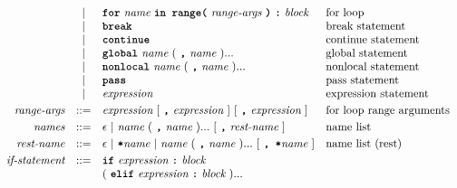 \[\begin{array}{rcll}
                            & |   & \term{for}\ \textit{name}\ \term{in\ range(}
                                    \ \textit{range-args}\ \term{)}\ \term{:}\ \textit{block}                                & \text{for loop}                         \\
                            & |   & \term{break}                                                                             & \text{break statement}                  \\
                            & |   & \term{continue}                                                                          & \text{continue statement}               \\
                            & |   & \term{global}\ \textit{name}\ (\ \term{,}\ \textit{name}\ )...                           & \text{global statement}                   \\
                            & |   & \term{nonlocal}\ \textit{name}\ (\ \term{,}\ \textit{name}\ )...                         & \text{nonlocal statement}               \\
                            & |   & \term{pass}                                                                              & \text{pass statement}               \\
                            & |   & \textit{expression}                                                                      & \text{expression statement}             \\[1mm]
\textit{range-args}         & ::= & \textit{expression}\ [\ \term{,}\ \textit{expression}\ ]
                                    \ [\ \term{,}\ \textit{expression}\ ]                                                    & \text{for loop range arguments}         \\[1mm]
\textit{names}              & ::= & \epsilon\ |\ \textit{name}\ (\ \term{,}\ \textit{name}\ )...\ [\ \term{,}\ \textit{rest-name}\ ]   & \text{name list}                        \\[1mm]
\textit{rest-name}          & ::= & \epsilon\ |\ \term{*}\textit{name}
                                    \ |\ \textit{name}\ (\ \term{,}\ \textit{name}\ )...\ [\ \term{,\ *}\textit{name}\ ]     & \text{name list (rest)}                 \\[1mm]
\textit{if-statement}       & ::= & \term{if}\ \textit{expression}\ \term{:}\ \textit{block}                                 &                                         \\
                            &     & (\ \term{elif}\ \textit{expression}\ \term{:}\ \textit{block}\ )...                      &                                         \\

\end{array}\]
